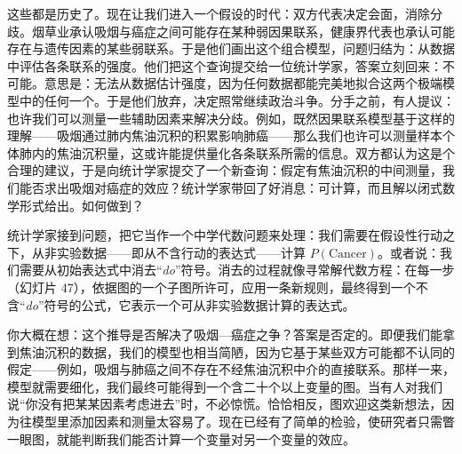 这些都是历史了。现在让我们进入一个假设的时代：双方代表决定会面，消除分歧。烟草业承认吸烟与癌症之间可能存在某种弱因果联系，健康界代表也承认可能存在与遗传因素的某些弱联系。于是他们画出这个组合模型，问题归结为：从数据中评估各条联系的强度。他们把这个查询提交给一位统计学家，答案立刻回来：不可能。意思是：无法从数据估计强度，因为任何数据都能完美地拟合这两个极端模型中的任何一个。于是他们放弃，决定照常继续政治斗争。分手之前，有人提议：也许我们可以测量一些辅助因素来解决分歧。例如，既然因果联系模型基于这样的理解——吸烟通过肺内焦油沉积的积累影响肺癌——那么我们也许可以测量样本个体肺内的焦油沉积量，这或许能提供量化各条联系所需的信息。双方都认为这是个合理的建议，于是向统计学家提交了一个新查询：假定有焦油沉积的中间测量，我们能否求出吸烟对癌症的效应？统计学家带回了好消息：可计算，而且解以闭式数学形式给出。如何做到？

\begin{center}
\end{center}

统计学家接到问题，把它当作一个中学代数问题来处理：我们需要在假设性行动之下，从非实验数据——即从不含行动的表达式——计算 $P(\text{Cancer})$。或者说：我们需要从初始表达式中消去“\textit{do}”符号。消去的过程就像寻常解代数方程：在每一步（幻灯片 47），依据图的一个子图所许可，应用一条新规则，最终得到一个不含“\textit{do}”符号的公式，它表示一个可从非实验数据计算的表达式。

\begin{center}
\end{center}

你大概在想：这个推导是否解决了吸烟—癌症之争？答案是否定的。即便我们能拿到焦油沉积的数据，我们的模型也相当简陋，因为它基于某些双方可能都不认同的假定——例如，吸烟与肺癌之间不存在不经焦油沉积中介的直接联系。那样一来，模型就需要细化，我们最终可能得到一个含二十个以上变量的图。当有人对我们说“你没有把某某因素考虑进去”时，不必惊慌。恰恰相反，图欢迎这类新想法，因为往模型里添加因素和测量太容易了。现在已经有了简单的检验，使研究者只需瞥一眼图，就能判断我们能否计算一个变量对另一个变量的效应。

